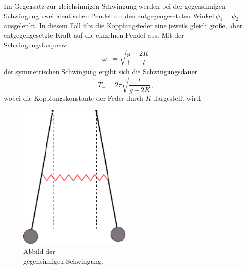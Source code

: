 \begin{minipage}[t]{0.5\textwidth}
\label{subsec:Gegen}
Im Gegensatz zur gleichsinnigen Schwingung werden bei der gegensinnigen Schwingung zwei identischen Pendel um den entgegengesetzten Winkel $\phi_1 = \phi_2$ ausgelenkt.
In diesem Fall übt die Kopplungsfeder eine jeweils gleich große, aber entgegengesetzte Kraft auf die einzelnen Pendel aus.
Mit der Schwingungsfrequenz
\begin{equation}
    \omega_- = \sqrt{\frac{g}{l} + \frac{2K}{l}}
    \label{eqn:omega-}
\end{equation}
der symmetrischen Schwingung ergibt sich die Schwingungsdauer
\begin{equation}
    T_- = 2\pi \sqrt{\frac{l}{g+2K}},
    \label{eqn:T-}
\end{equation}
wobei die Kopplungskonstante der Feder durch $K$ dargestellt wird.
\end{minipage}
\begin{minipage}[t]{0.5\textwidth}
    \begin{figure}[H]
        \centering
        \includegraphics[width=0.5\textwidth]{build/Abb_2.pdf}
        \caption{Abbild der \\gegensinnigen Schwingung. \cite{V106}}
        \label{fig:gegen}
      \end{figure}
\end{minipage}
